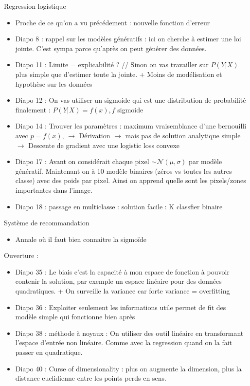 \documentclass{article}
\theoremstyle{plain}%
\theoremstyle{definition}
\theoremstyle{remark}
\begin{document}
Regression logistique
\begin{itemize}
    \item Proche de ce qu'on a vu précédement : nouvelle fonction d'erreur
    \item Diapo 8 : rappel sur les modèles génératifs : ici on cherche à estimer une loi jointe. C'est sympa parce qu'après on peut générer des données. 
    \item Diapo 11 : Limite = explicabilité ? // Sinon on vas travailler sur $ P(Y|X) $ plus simple que d'estimer toute la jointe. + Moins de modélisation et hypothèse sur les données
    \item Diapo 12 : On vas utiliser un sigmoide qui est une distribution de probabilité finalement : $ P(Y |X) = f(x), f$ sigmoide
    \item Diapo 14 : Trouver les paramètres : maximum vraisemblance d'une bernouilli avec $ p = f(x) $, $\rightarrow$ Dérivation $\rightarrow$ mais pas de solution analytique simple $\rightarrow$ Descente de gradient avec une logistic loss convexe
    \item Diapo 17 : Avant on considérait chaque pixel $ \sim \mathcal{N}(\mu , \sigma ) $ par modèle génératif. Maintenant on à 10 modèle binaires (zéros vs toutes les autres classe) avec des poids par pixel. Ainsi on apprend quelle sont les pixels/zones importantes dans l'image.
    \item Diapo 18 : passage en multiclasse : solution facile : K classfier binaire 
\end{itemize}
Système de recommandation
\begin{itemize}
    \item Annale où il faut bien connaitre la sigmoïde
\end{itemize}
Ouverture :
\begin{itemize}
    \item Diapo 35 : Le biais c'est la capacité à mon espace de fonction à pouvoir contenir la solution, par exemple un espace linéaire pour des données quadratiques. + On surveille la variance car forte variance = overfitting
    \item Diapo 36 : Exploiter seulement les informations utile permet de fit des modèle simple qui fonctionne bien après 
    \item Diapo 38 : méthode à noyaux : On utiliser des outil linéaire en transformant l'espace d'entrée non linéaire. Comme avec la regression quand on la fait passer en quadratique.
    \item Diapo 40 : Curse of dimensionality : plus on augmente la dimension, plus la distance euclidienne entre les points perds en sens. 
\end{itemize}
\end{document}
